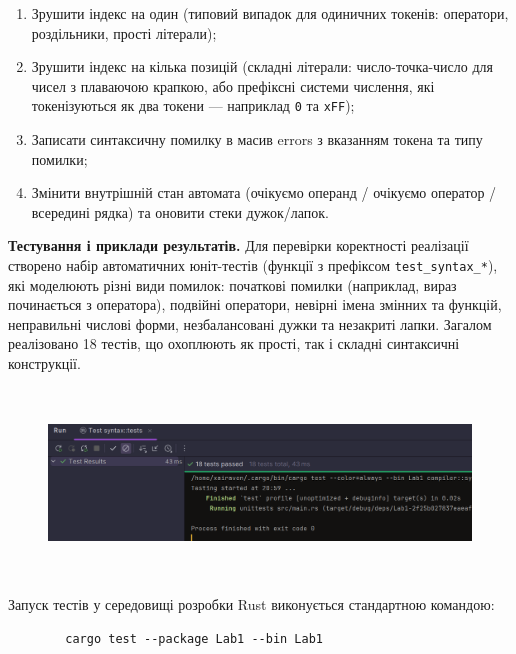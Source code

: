 \documentclass[14pt, a4paper]{extreport}
\begin{document}
	\begin{enumerate}
		\item Зрушити індекс на один (типовий випадок для одиничних токенів: оператори, роздільники, прості літерали);
		\item Зрушити індекс на кілька позицій (складні літерали: число-точка-число для чисел з плаваючою крапкою, або префіксні системи числення, які токенізуються як два токени — наприклад \texttt{0} та \texttt{xFF});
		\item Записати синтаксичну помилку в масив errors з вказанням токена та типу помилки;
		\item Змінити внутрішній стан автомата (очікуємо операнд / очікуємо оператор / всередині рядка) та оновити стеки дужок/лапок.
	\end{enumerate}
	
	\bigskip
	
	\textbf{Тестування і приклади результатів.} Для перевірки коректності реалізації створено набір автоматичних юніт-тестів (функції з префіксом \texttt{test\_syntax\_*}), які моделюють різні види помилок: початкові помилки (наприклад, вираз починається з оператора), подвійні оператори, невірні імена змінних та функцій, неправильні числові форми, незбалансовані дужки та незакриті лапки. Загалом реалізовано 18 тестів, що охоплюють як прості, так і складні синтаксичні конструкції.
	
	\begin{figure}[H]
		\centering
		\includegraphics[height=5cm]{2} 
	\end{figure}
	
	Запуск тестів у середовищі розробки Rust виконується стандартною командою:
	\begin{lstlisting}
		cargo test --package Lab1 --bin Lab1
	\end{lstlisting}
	
	\pagebreak
	
\end{document}
